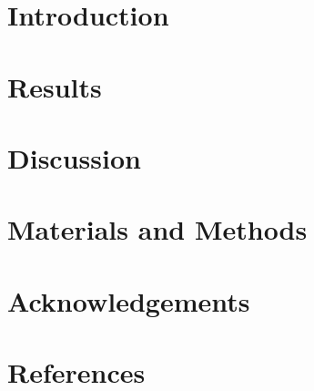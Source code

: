 \documentclass[a4paper]{article}
\begin{document}
\section{Introduction}

\section{Results}

\section{Discussion}

\section{Materials and Methods}

\section{Acknowledgements}

\section{References}
\end{document}
